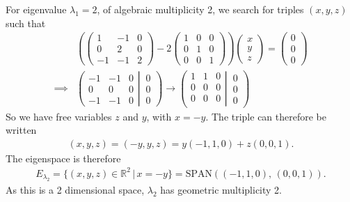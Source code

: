 {For eigenvalue $\lambda_1=2$, of algebraic multiplicity 2, we search for triples $(x,y,z)$ such that
\begin{align*}
&
\left(\begin{pmatrix}
  1 & -1 &  0 \\
  0 &  2 &  0 \\
 -1 & -1 &  2
\end{pmatrix}
-
2
\begin{pmatrix}
  1 &  0 &  0 \\
  0 &  1 &  0 \\
  0 &  0 &  1
\end{pmatrix}\right)
\begin{pmatrix}
  x \\
  y \\
  z
\end{pmatrix}
=
\begin{pmatrix}
  0 \\
  0 \\
  0
\end{pmatrix} \\
\implies &
\left(
	\begin{matrix}
 -1 & -1 &  0 \\
  0 &  0 &  0 \\
 -1 & -1 &  0
	\end{matrix}
  \left| \, 
	\begin{matrix}
  0 \\
  0 \\
  0 
	\end{matrix}
  \right.
\right)
\to
\left(
	\begin{matrix}
  1 &  1 &  0 \\
  0 &  0 &  0 \\
  0 &  0 &  0 \\
	\end{matrix}
  \left| \, 
	\begin{matrix}
	  0 \\
	  0 \\
	  0 
    \end{matrix}
  \right.
\right)
\end{align*}
So we have free variables $z$ and $y$, with $x=-y$. The triple can therefore be written
\begin{align*}
(x,y,z) = (-y,y,z) = y(-1,1,0) + z(0,0,1).
\end{align*}
The eigenspace is therefore
\begin{align*}
E_{\lambda_2} = \{ (x,y,z)\in\mathbb{R}^2 \, | \, x=-y \} = \text{SPAN}((-1,1,0), \, (0,0,1)).
\end{align*}
As this is a 2 dimensional space, $\lambda_2$ has geometric multiplicity 2.
}

